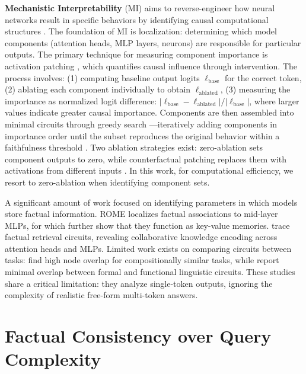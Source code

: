 \documentclass[11pt]{article}
\newcommand{\rparagraph}[1]{\vspace{1.2mm}\noindent\textbf{#1}}
\begin{document}
\rparagraph{Mechanistic Interpretability} (MI) aims to reverse-engineer how neural networks result in specific behaviors by identifying causal computational structures \cite{elhage2021mathematical,zhang2024how}. The foundation of MI is localization: determining which model components (attention heads, MLP layers, neurons) are responsible for particular outputs. The primary technique for measuring component importance is activation patching \cite{meng2022locating}, which quantifies causal influence through intervention. The process involves: (1) computing baseline output logits $\ell_{\text{base}}$ for the correct token, (2) ablating each component individually to obtain $\ell_{\text{ablated}}$, (3) measuring the importance as normalized logit difference: $|\ell_{\text{base}} - \ell_{\text{ablated}}|/|\ell_{\text{base}}|$, where larger values indicate greater causal importance. Components are then assembled into minimal circuits through greedy search \cite{conmy2023towards,hanna2024have}—iteratively adding components in importance order until the subset reproduces the original behavior within a faithfulness threshold \cite{wang2023interpretability}. Two ablation strategies exist: zero-ablation \cite{olsson2022context} sets component outputs to zero, while counterfactual patching replaces them with activations from different inputs \cite{meng2022locating}. In this work, for computational efficiency, we resort to zero-ablation when identifying component sets.

A significant amount of work focused on identifying parameters in which models store factual information. ROME \cite{meng2022locating} localizes factual associations to mid-layer MLPs, for which \citet{geva-etal-2023-dissecting} further show that they function as key-value memories. \citet{yao2024knowledge} trace factual retrieval circuits, revealing collaborative knowledge encoding across attention heads and MLPs. Limited work exists on comparing circuits between tasks: \citet{mondorf2024circuit} find high node overlap for compositionally similar tasks, while \citet{hanna2025formal} report minimal overlap between formal and functional linguistic circuits. These studies share a critical limitation: they analyze single-token outputs, ignoring the complexity of realistic free-form multi-token answers. 

\section{Factual Consistency over Query Complexity}\label{sec:task}
\end{document}
